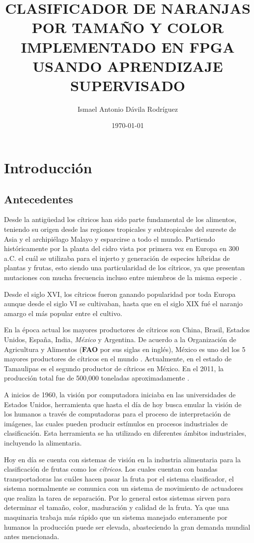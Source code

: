 \documentclass[twoside,spanish,ESP,MSc]{plantillaLabUPV}
\title	{CLASIFICADOR DE NARANJAS POR TAMAÑO  Y COLOR IMPLEMENTADO EN FPGA USANDO APRENDIZAJE SUPERVISADO}
\author      	{Ismael Antonio Dávila Rodríguez}
\date           	{\today}
\theoremstyle{definition}
\begin{document}
\makeintropages



\chapter{Introducción} \label{chap:intro}

\section{Antecedentes}

Desde la antigüedad los cítricos han sido parte fundamental de los alimentos, teniendo su origen desde las regiones tropicales y subtropicales del sureste de Asia y el archipiélago Malayo y esparcirse a todo el mundo. Partiendo históricamente por la planta del cidro vista por primera vez en Europa en 300 a.C. el cuál se utilizaba para el injerto y generación de especies híbridas de plantas y frutas, esto siendo una particularidad de los cítricos, ya que presentan mutaciones con mucha frecuencia incluso entre miembros de la misma especie \cite{anticidi}.

Desde el siglo XVI, los cítricos fueron ganando popularidad por toda Europa aunque desde el siglo VI se cultivaban, hasta que en el siglo XIX fué el naranjo amargo el más popular entre el cultivo.

En la época actual los mayores productores de cítricos son China, Brasil, Estados Unidos, España, India, \textit{México} y Argentina. De acuerdo a la Organización de Agricultura y Alimentos (\textbf{FAO} por sus siglas en inglés), México es uno del los 5 mayores productores de cítricos en el mundo \cite{FAO_2016}. Actualmente, en el estado de Tamaulipas es el segundo productor de cítricos en México. En el 2011, la producción total fue de 500,000 toneladas aproximadamente \cite{sag}.


A inicios de 1960, la visión por computadora iniciaba en las universidades de Estados Unidos, herramienta que hasta el día de hoy busca emular la visión de los humanos a través de computadoras para el proceso de interpretación de imágenes, las cuales pueden producir estímulos en procesos industriales de clasificación. Esta herramienta se ha utilizado en diferentes ámbitos industriales, incluyendo la alimentaria.

Hoy en día se cuenta con sistemas de visión en la industria alimentaria para la clasificación de frutas como los \textit{cítricos}. Los cuales cuentan con bandas transportadoras las cuáles hacen pasar la fruta por el sistema clasificador, el sistema normalmente se comunica con un sistema de movimiento de actuadores que realiza la tarea de separación. Por lo general estos sistemas sirven para determinar el tamaño, color, maduración y calidad de la fruta. Ya que una maquinaria trabaja más rápido que un sistema manejado enteramente por humanos la producción puede ser elevada, abasteciendo la gran demanda mundial antes mencionada. 
\end{document}
